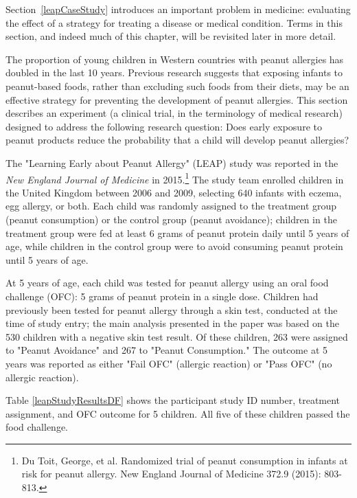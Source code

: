 
Section~\ref{leapCaseStudy} introduces an important problem in medicine: evaluating the effect of a strategy for treating a disease or medical condition. Terms in this section, and indeed much of this chapter, will be revisited later in more detail.

The proportion of young children in Western countries with peanut allergies has doubled in the last 10 years. Previous research suggests that exposing infants to peanut-based foods, rather than excluding such foods from their diets, may be an effective strategy for preventing the development of peanut allergies. This section describes an experiment (a clinical trial, in the terminology of medical research) designed to address the following research question: Does early exposure to peanut products reduce the probability that a child will develop peanut allergies? 

The "Learning Early about Peanut Allergy" (LEAP) study was reported in the \textit{New England Journal of Medicine} in 2015.\footnote{Du Toit, George, et al. Randomized trial of peanut consumption in infants at risk for peanut allergy. New England Journal of Medicine 372.9 (2015): 803-813.} The study team enrolled children in the United Kingdom between 2006 and 2009, selecting 640 infants with eczema, egg allergy, or both. Each child was randomly assigned to the treatment group (peanut consumption) or the control group (peanut avoidance); children in the treatment group were fed at least 6 grams of peanut protein daily until 5 years of age, while children in the control group were to avoid consuming peanut protein until 5 years of age. 

At 5 years of age, each child was tested for peanut allergy using an oral food challenge (OFC): 5 grams of peanut protein in a single dose. Children had previously been tested for peanut allergy through a skin test, conducted at the time of study entry; the main analysis presented in the paper was based on the 530 children with a negative skin test result. Of these children, 263 were assigned to "Peanut Avoidance" and 267 to "Peanut Consumption." The outcome at 5 years was reported as either "Fail OFC" (allergic reaction) or "Pass OFC" (no allergic reaction). 

Table \ref{leapStudyResultsDF} shows the participant study ID number, treatment assignment, and OFC outcome for 5 children. All five of these children passed the food challenge. 
 

